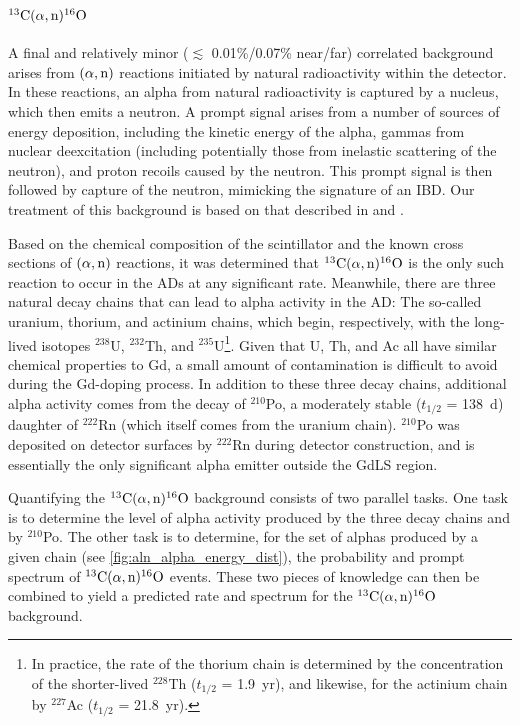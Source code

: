 \documentclass[../thesis.tex]{subfiles}
\begin{document}
\section{$^{13}\mathrm{C}(\alpha, \mathrm{n})^{16}\mathrm{O}$}
\label{sec:bkgCanO}

A final and relatively minor ($\lesssim$ 0.01\%/0.07\% near/far) correlated background arises from $(\alpha,\mathrm{n})$ reactions initiated by natural radioactivity within the detector. In these reactions, an alpha from natural radioactivity is captured by a nucleus, which then emits a neutron. A prompt signal arises from a number of sources of energy deposition, including the kinetic energy of the alpha, gammas from nuclear deexcitation (including potentially those from inelastic scattering of the neutron), and proton recoils caused by the neutron. This prompt signal is then followed by capture of the neutron, mimicking the signature of an IBD. Our treatment of this background is based on that described in \cite{Zhao_2014} and \cite{An_2017}.

Based on the chemical composition of the scintillator and the known cross sections of $(\alpha,\mathrm{n})$ reactions, it was determined that $^{13}\mathrm{C}(\alpha, \mathrm{n})^{16}\mathrm{O}$ is the only such reaction to occur in the ADs at any significant rate. Meanwhile, there are three natural decay chains that can lead to alpha activity in the AD: The so-called uranium, thorium, and actinium chains, which begin, respectively, with the long-lived isotopes $^{238}$U, $^{232}$Th, and $^{235}$U\footnote{In practice, the rate of the thorium chain is determined by the concentration of the shorter-lived $^{228}$Th ($t_{1/2}$ = 1.9~yr), and likewise, for the actinium chain by $^{227}$Ac ($t_{1/2}$ = 21.8~yr).}. Given that U, Th, and Ac all have similar chemical properties to Gd, a small amount of contamination is difficult to avoid during the Gd-doping process. In addition to these three decay chains, additional alpha activity comes from the decay of $^{210}$Po, a moderately stable ($t_{1/2}$ = 138~d) daughter of $^{222}$Rn (which itself comes from the uranium chain). $^{210}$Po was deposited on detector surfaces by $^{222}$Rn during detector construction, and is essentially the only significant alpha emitter outside the GdLS region.

Quantifying the $^{13}\mathrm{C}(\alpha, \mathrm{n})^{16}\mathrm{O}$ background consists of two parallel tasks. One task is to determine the level of alpha activity produced by the three decay chains and by $^{210}$Po. The other task is to determine, for the set of alphas produced by a given chain (see \autoref{fig:aln_alpha_energy_dist}), the probability and prompt spectrum of $^{13}\mathrm{C}(\alpha, \mathrm{n})^{16}\mathrm{O}$ events. These two pieces of knowledge can then be combined to yield a predicted rate and spectrum for the $^{13}\mathrm{C}(\alpha, \mathrm{n})^{16}\mathrm{O}$ background.
\end{document}
